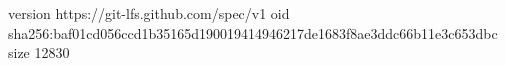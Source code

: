 version https://git-lfs.github.com/spec/v1
oid sha256:baf01cd056ccd1b35165d190019414946217de1683f8ae3ddc66b11e3c653dbc
size 12830
